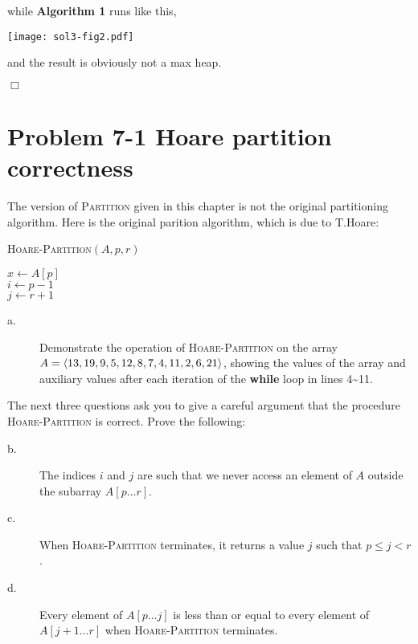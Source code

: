 \documentclass[a4paper,10pt]{article}
\newcommand{\problem}[1]{\section*{Problem #1}}
\newcommand{\qed}{\hfill \ensuremath{\Box}}
\begin{document}
while \textbf{Algorithm 1} runs like this,

\begin{center}
  \texttt{[image: sol3-fig2.pdf]}
\end{center}

and the result is obviously not a max heap.

\qed

\problem{7-1 Hoare partition correctness}
The version of \textsc{Partition} given in this chapter is not the original partitioning algorithm. 
Here is the original parition algorithm, which is due to T.Hoare:

\begin{algorithm}[H]
\caption{\textsc{Hoare-Partition}$(A, p, r)$}
$x \leftarrow A[p]$\\
$i \leftarrow p - 1$\\
$j \leftarrow r + 1$\\
\end{algorithm}

\begin{description}
\item[a. \hspace{9pt}] Demonstrate the operation of \textsc{Hoare-Partition} on the array 
$A=\langle13, 19, 9, 5, 12, 8, 7, 4,\\ 11, 2, 6, 21\rangle$, showing the values of
the array and auxiliary values after each iteration of the \textbf{while} loop in lines 4\textasciitilde 11.\\

\end{description}
The next three questions ask you to give a careful argument that the procedure \textsc{Hoare-Partition} is correct.
Prove the following:

\begin{description}
\item[b. \hspace{9pt}] The indices $i$ and $j$ are such that we never access an element of $A$ outside
the subarray $A[p\ldots r]$.

\item[c. \hspace{9pt}] When \textsc{Hoare-Partition} terminates, it returns a value $j$ such that $p\leq j < r$.

\item[d. \hspace{9pt}] Every element of $A[p\ldots j]$ is less than or equal to every element of
$A[j + 1\ldots r]$ when \textsc{Hoare-Partition} terminates.
\end{description}
\end{document}

